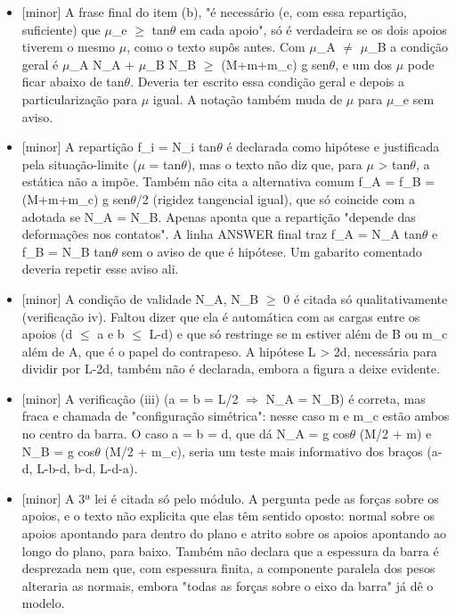 \documentclass{article}%
\begin{document}
\begin{itemize}%
\item%
{[}minor{]} A frase final do item (b), "é necessário (e, com essa repartição, suficiente) que $\mu$\_e $\geq$ tan$\theta$ em cada apoio", só é verdadeira se os dois apoios tiverem o mesmo $\mu$, como o texto supôs antes. Com $\mu$\_A $\neq$ $\mu$\_B a condição geral é $\mu$\_A N\_A + $\mu$\_B N\_B $\geq$ (M+m+m\_c) g sen$\theta$, e um dos $\mu$ pode ficar abaixo de tan$\theta$. Deveria ter escrito essa condição geral e depois a particularização para $\mu$ igual. A notação também muda de $\mu$ para $\mu$\_e sem aviso.%
\item%
{[}minor{]} A repartição f\_i = N\_i tan$\theta$ é declarada como hipótese e justificada pela situação{-}limite ($\mu$ = tan$\theta$), mas o texto não diz que, para $\mu$ > tan$\theta$, a estática não a impõe. Também não cita a alternativa comum f\_A = f\_B = (M+m+m\_c) g sen$\theta$/2 (rigidez tangencial igual), que só coincide com a adotada se N\_A = N\_B. Apenas aponta que a repartição "depende das deformações nos contatos". A linha ANSWER final traz f\_A = N\_A tan$\theta$ e f\_B = N\_B tan$\theta$ sem o aviso de que é hipótese. Um gabarito comentado deveria repetir esse aviso ali.%
\item%
{[}minor{]} A condição de validade N\_A, N\_B $\geq$ 0 é citada só qualitativamente (verificação iv). Faltou dizer que ela é automática com as cargas entre os apoios (d $\leq$ a e b $\leq$ L-d) e que só restringe se m estiver além de B ou m\_c além de A, que é o papel do contrapeso. A hipótese L > 2d, necessária para dividir por L-2d, também não é declarada, embora a figura a deixe evidente.%
\item%
{[}minor{]} A verificação (iii) (a = b = L/2 $\Rightarrow$ N\_A = N\_B) é correta, mas fraca e chamada de "configuração simétrica": nesse caso m e m\_c estão ambos no centro da barra. O caso a = b = d, que dá N\_A = g cos$\theta$ (M/2 + m) e N\_B = g cos$\theta$ (M/2 + m\_c), seria um teste mais informativo dos braços (a-d, L-b-d, b-d, L-d-a).%
\item%
{[}minor{]} A 3ª lei é citada só pelo módulo. A pergunta pede as forças sobre os apoios, e o texto não explicita que elas têm sentido oposto: normal sobre os apoios apontando para dentro do plano e atrito sobre os apoios apontando ao longo do plano, para baixo. Também não declara que a espessura da barra é desprezada nem que, com espessura finita, a componente paralela dos pesos alteraria as normais, embora "todas as forças sobre o eixo da barra" já dê o modelo.%
\end{itemize}%
\end{document}
